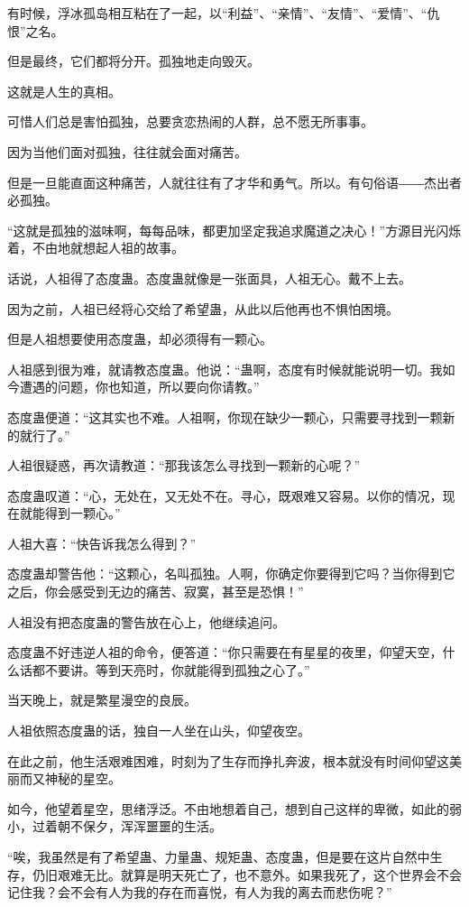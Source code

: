 \begin{this_body}
有时候，浮冰孤岛相互粘在了一起，以“利益”、“亲情”、“友情”、“爱情”、“仇恨”之名。

但是最终，它们都将分开。孤独地走向毁灭。

这就是人生的真相。

可惜人们总是害怕孤独，总要贪恋热闹的人群，总不愿无所事事。

因为当他们面对孤独，往往就会面对痛苦。

但是一旦能直面这种痛苦，人就往往有了才华和勇气。所以。有句俗语――杰出者必孤独。

“这就是孤独的滋味啊，每每品味，都更加坚定我追求魔道之决心！”方源目光闪烁着，不由地就想起人祖的故事。

话说，人祖得了态度蛊。态度蛊就像是一张面具，人祖无心。戴不上去。

因为之前，人祖已经将心交给了希望蛊，从此以后他再也不惧怕困境。

但是人祖想要使用态度蛊，却必须得有一颗心。

人祖感到很为难，就请教态度蛊。他说：“蛊啊，态度有时候就能说明一切。我如今遭遇的问题，你也知道，所以要向你请教。”

态度蛊便道：“这其实也不难。人祖啊，你现在缺少一颗心，只需要寻找到一颗新的就行了。”

人祖很疑惑，再次请教道：“那我该怎么寻找到一颗新的心呢？”

态度蛊叹道：“心，无处在，又无处不在。寻心，既艰难又容易。以你的情况，现在就能得到一颗心。”

人祖大喜：“快告诉我怎么得到？”

态度蛊却警告他：“这颗心，名叫孤独。人啊，你确定你要得到它吗？当你得到它之后，你会感受到无边的痛苦、寂寞，甚至是恐惧！”

人祖没有把态度蛊的警告放在心上，他继续追问。

态度蛊不好违逆人祖的命令，便答道：“你只需要在有星星的夜里，仰望天空，什么话都不要讲。等到天亮时，你就能得到孤独之心了。”

当天晚上，就是繁星漫空的良辰。

人祖依照态度蛊的话，独自一人坐在山头，仰望夜空。

在此之前，他生活艰难困难，时刻为了生存而挣扎奔波，根本就没有时间仰望这美丽而又神秘的星空。

如今，他望着星空，思绪浮泛。不由地想着自己，想到自己这样的卑微，如此的弱小，过着朝不保夕，浑浑噩噩的生活。

“唉，我虽然是有了希望蛊、力量蛊、规矩蛊、态度蛊，但是要在这片自然中生存，仍旧艰难无比。就算是明天死亡了，也不意外。如果我死了，这个世界会不会记住我？会不会有人为我的存在而喜悦，有人为我的离去而悲伤呢？”


\end{this_body}
